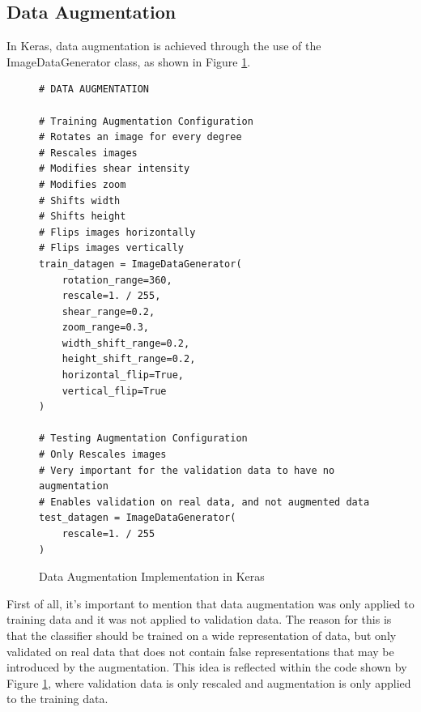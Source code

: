 \documentclass{l4proj}
\begin{document}
\subsection{Data Augmentation}
In Keras, data augmentation is achieved through the use of the ImageDataGenerator class, as shown in Figure \ref{fig:KerasDataAugmentation}.

\begin{figure}
\caption{Data Augmentation Implementation in Keras}
\label{fig:KerasDataAugmentation}
\begin{lstlisting}
# DATA AUGMENTATION

# Training Augmentation Configuration
# Rotates an image for every degree
# Rescales images
# Modifies shear intensity
# Modifies zoom
# Shifts width
# Shifts height
# Flips images horizontally
# Flips images vertically
train_datagen = ImageDataGenerator(
    rotation_range=360,
    rescale=1. / 255,
    shear_range=0.2,
    zoom_range=0.3,
    width_shift_range=0.2,
    height_shift_range=0.2,
    horizontal_flip=True,
    vertical_flip=True
)
    
# Testing Augmentation Configuration
# Only Rescales images
# Very important for the validation data to have no augmentation
# Enables validation on real data, and not augmented data
test_datagen = ImageDataGenerator(
    rescale=1. / 255
)

\end{lstlisting}
\end{figure}

First of all, it's important to mention that data augmentation was only applied to training data and it was not applied to validation data.
The reason for this is that the classifier should be trained on a wide representation of data, but only validated on real data that does not contain false representations that may be introduced by the augmentation.
This idea is reflected within the code shown by Figure \ref{fig:KerasDataAugmentation}, where validation data is only rescaled and augmentation is only applied to the training data.
\end{document}
